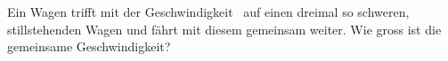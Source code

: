 Ein Wagen trifft mit der Geschwindigkeit \vWaO\ auf einen dreimal so schweren, stillstehenden Wagen und fährt mit diesem gemeinsam weiter. Wie gross ist die gemeinsame Geschwindigkeit?
